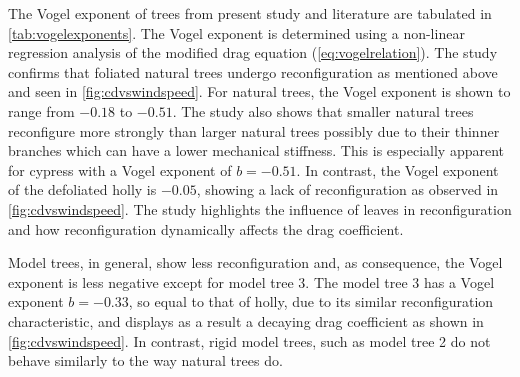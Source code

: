 The Vogel exponent of trees from present study and literature are tabulated in \cref{tab:vogelexponents}. The Vogel exponent is determined using a non-linear regression analysis of the modified drag equation (\cref{eq:vogelrelation}). The study confirms that foliated natural trees undergo reconfiguration as mentioned above and seen in \cref{fig:cdvswindspeed}. For natural trees, the Vogel exponent is shown to range from $-0.18$ to $-0.51$. The study also shows that smaller natural trees reconfigure more strongly than larger natural trees possibly due to their thinner branches which can have a lower mechanical stiffness. This is especially apparent for cypress with a Vogel exponent of $b=-0.51$. In contrast, the Vogel exponent of the defoliated holly is $-0.05$, showing a lack of reconfiguration as observed in \cref{fig:cdvswindspeed}. The study highlights the influence of leaves in reconfiguration and how reconfiguration dynamically affects the drag coefficient.

{
}

Model trees, in general, show less reconfiguration and, as consequence, the Vogel exponent is less negative except for model tree 3. The model tree 3 has a Vogel exponent $b=-0.33$, so equal to that of holly, due to its similar reconfiguration characteristic, and displays as a result a decaying drag coefficient as shown in \cref{fig:cdvswindspeed}. In contrast, rigid model trees, such as model tree 2 do not behave similarly to the way natural trees do.


